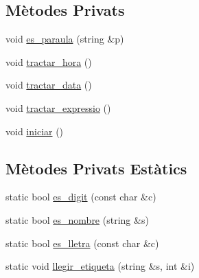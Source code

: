 \subsection*{Mètodes Privats}
\begin{DoxyCompactItemize}
\item 
void \hyperlink{class_token_a8b4b59b918158b7eb767e5f78730bb3f}{es\-\_\-paraula} (string \&p)
\item 
void \hyperlink{class_token_a37eb2cacee3a373bff5794e0eeffe7b4}{tractar\-\_\-hora} ()
\item 
void \hyperlink{class_token_a6caad8c345876742de8ee08fc9a13910}{tractar\-\_\-data} ()
\item 
void \hyperlink{class_token_abcc042ca3e95feefac091792ee526fc2}{tractar\-\_\-expressio} ()
\item 
void \hyperlink{class_token_a8115f6d5917bd05f7cd568622318af24}{iniciar} ()
\end{DoxyCompactItemize}
\subsection*{Mètodes Privats Estàtics}
\begin{DoxyCompactItemize}
\item 
static bool \hyperlink{class_token_a128f20b69704c51c86490a96c3d49084}{es\-\_\-digit} (const char \&c)
\item 
static bool \hyperlink{class_token_a93569340aa393358e31205fbb57f7978}{es\-\_\-nombre} (string \&s)
\item 
static bool \hyperlink{class_token_a29e03315052975e392b62f78f026fb41}{es\-\_\-lletra} (const char \&c)
\item 
static void \hyperlink{class_token_a4910b5b17b9398996a51a8ad9193420c}{llegir\-\_\-etiqueta} (string \&s, int \&i)
\end{DoxyCompactItemize}
